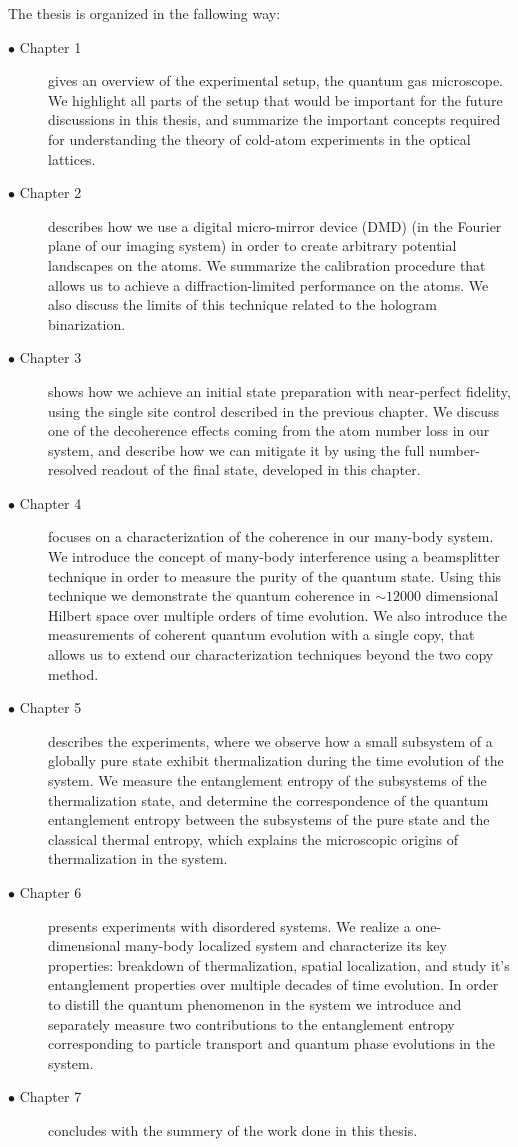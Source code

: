 The thesis is organized in the fallowing way:
\begin{description}
	\item[$\bullet$ Chapter 1] gives an overview of the experimental setup, the quantum gas microscope. We highlight all parts of the setup that would be important for the future discussions in this thesis, and summarize the important concepts required for understanding the theory of cold-atom experiments in the optical lattices.
	\item[$\bullet$ Chapter 2] describes how we use a digital micro-mirror device (DMD) (in the Fourier plane of our imaging system) in order to create arbitrary potential landscapes on the atoms. We summarize the calibration procedure that allows us to achieve a diffraction-limited performance on the atoms. We also discuss the limits of this technique related to the hologram binarization.
	\item[$\bullet$ Chapter 3] shows how we achieve an initial state preparation with near-perfect fidelity, using the single site control described in the previous chapter. We discuss one of the decoherence effects coming from the atom number loss in our system, and describe how we can mitigate it by using the full number-resolved readout of the final state, developed in this chapter.
	\item[$\bullet$ Chapter 4] focuses on a characterization of the coherence in our many-body system. We introduce the concept of many-body interference using a beamsplitter technique in order to measure the purity of the quantum state. Using this technique we demonstrate the quantum coherence in $\sim12000$ dimensional Hilbert space over multiple orders of time evolution. We also introduce the measurements of coherent quantum evolution with a single copy, that allows us to extend our characterization techniques beyond the two copy method. 
	\item[$\bullet$ Chapter 5] describes the experiments, where we observe how a small subsystem of a globally pure state exhibit thermalization during the time evolution of the system. We measure the entanglement entropy of the subsystems of the thermalization state, and determine the correspondence of the quantum entanglement entropy between the subsystems of the pure state and the classical thermal entropy, which explains the microscopic origins of thermalization in the system.
	\item[$\bullet$ Chapter 6] presents experiments with disordered systems. We realize a one-dimensional many-body localized system and characterize its key properties: breakdown of thermalization, spatial localization, and study it's entanglement properties over multiple decades of time evolution. In order to distill the quantum phenomenon in the system we introduce and separately measure two contributions to the entanglement entropy corresponding to particle transport and quantum phase evolutions in the system.
	 \item[$\bullet$ Chapter 7] concludes with the summery of the work done in this thesis.
\end{description}